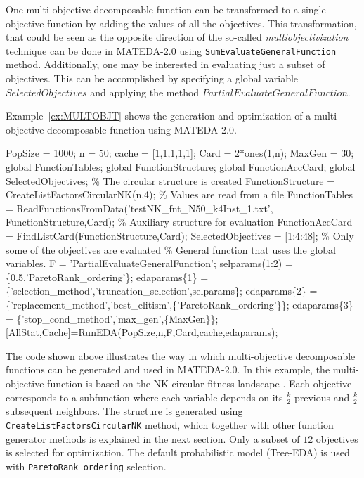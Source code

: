 \documentclass[a4paper]{article}
\begin{document}
One multi-objective decomposable function can be transformed to a
single objective function by adding the values of all the
objectives.  This  transformation, that could be seen as the
opposite direction of the so-called \emph{multiobjectivization}
technique \cite{Knowles_et_al:2001} can be done in MATEDA-2.0 using
\texttt{SumEvaluateGeneralFunction} method. Additionally, one may be
interested in evaluating just a subset of objectives. This can
be accomplished by specifying a global variable $SelectedObjectives$
and applying the method $PartialEvaluateGeneralFunction$.

Example~\ref{ex:MULTOBJT} shows the generation and optimization of a
multi-objective decomposable function using MATEDA-2.0.

\begin{example}
 \begin{programf}
 PopSize = 1000;
 n = 50;
 cache = [1,1,1,1,1];
 Card = 2*ones(1,n);
 MaxGen = 30;
 global FunctionTables;
 global FunctionStructure;
 global FunctionAccCard;
 global SelectedObjectives;
 \% The circular structure is created
 FunctionStructure =  CreateListFactorsCircularNK(n,4);
 \% Values are read from a file
 FunctionTables = ReadFunctionsFromData('testNK\_fnt\_N50\_k4Inst\_1.txt',
 FunctionStructure,Card);
 \% Auxiliary structure for  evaluation
 FunctionAccCard = FindListCard(FunctionStructure,Card);
 SelectedObjectives = [1:4:48]; \% Only some of the objectives are evaluated
\% General function that uses the global variables.
 F = 'PartialEvaluateGeneralFunction';
 selparams(1:2) =\{0.5,'ParetoRank\_ordering'\};
 edaparams\{1\} = \{'selection\_method','truncation\_selection',selparams\};
 edaparams\{2\} = \{'replacement\_method','best\_elitism',\{'ParetoRank\_ordering'\}\};
 edaparams\{3\} = \{'stop\_cond\_method','max\_gen',\{MaxGen\}\};
 [AllStat,Cache]=RunEDA(PopSize,n,F,Card,cache,edaparams); \end{programf}
\label{ex:MULTOBJT}  \end{example}



 The code shown above illustrates the way in which multi-objective decomposable functions
 can be  generated and used in MATEDA-2.0. In this example, the
 multi-objective function is based on the NK circular fitness landscape \cite{Kauffman:1993}. Each objective
 corresponds to a subfunction where each
variable depends on its $\frac{k}{2}$  previous and $\frac{k}{2}$
subsequent neighbors. The structure is generated using
\texttt{CreateListFactorsCircularNK} method, which together with
other function generator methods is explained in the next section.
Only a subset of $12$ objectives is selected for optimization. The
default probabilistic model (Tree-EDA) is used with
\texttt{ParetoRank\_ordering} selection.
\end{document}
